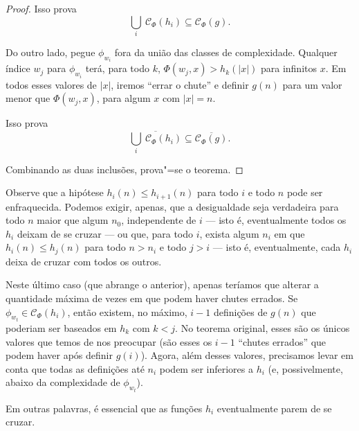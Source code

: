 \begin{proof}
    Isso prova
    \begin{equation*}
        \bigcup_i \ \mathcal C_\Phi(h_i) \subseteq \mathcal C_\Phi(g).
    \end{equation*}

    Do outro lado,
    pegue $\phi_{w_i}$ fora da união das classes de complexidade.
    Qualquer índice $w_j$ para $\phi_{w_i}$
    terá, para todo $k$,
    $\Phi(w_j, x) > h_k(|x|)$ para infinitos $x$.
    Em todos esses valores de $|x|$,
    iremos ``errar o chute''
    e definir $g(n)$
    para um valor menor que $\Phi(w_j, x)$,
    para algum $x$ com $|x| = n$.

    Isso prova
    \begin{equation*}
        \overline{\bigcup_i \ \mathcal C_\Phi(h_i)}
        \subseteq \overline{\mathcal C_\Phi(g)}.
    \end{equation*}

    Combinando as duas inclusões, prova"=se o teorema.
\end{proof}

Observe que a hipótese $h_i(n) \leq h_{i+1}(n)$
para todo $i$ e todo $n$
pode ser enfraquecida.
Podemos exigir, apenas,
que a desigualdade seja verdadeira para todo $n$
maior que algum $n_0$,
independente de $i$
--- isto é, eventualmente todos os $h_i$
deixam de se cruzar
---
ou que, para todo $i$,
exista algum $n_i$ em que
$h_i(n) \leq h_j(n)$ para todo $n > n_i$
e todo $j > i$
--- isto é, eventualmente,
cada $h_i$ deixa de cruzar com todos os outros.

Neste último caso
(que abrange o anterior),
apenas teríamos que alterar a quantidade máxima de vezes
em que podem haver chutes errados.
Se $\phi_{w_t} \in \mathcal C_\Phi(h_i)$,
então existem, no máximo,
$i - 1$ definições de $g(n)$
que poderiam ser baseados em $h_k$
com $k < j$.
No teorema original,
esses são os únicos valores que temos de nos preocupar
(são esses os $i-1$ ``chutes errados'' que podem haver
após definir $g(i)$).
Agora, além desses valores,
precisamos levar em conta que
todas as definições até $n_i$
podem ser inferiores a $h_i$
(e, possivelmente, abaixo da complexidade de $\phi_{w_t}$).

Em outras palavras,
é essencial que as funções $h_i$
eventualmente parem de se cruzar.

